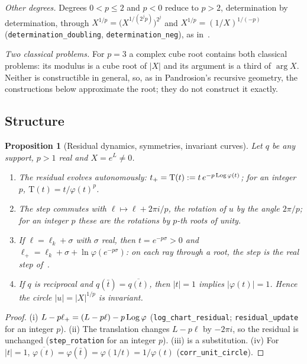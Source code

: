 \documentclass[10pt,a4paper]{article}
\theoremstyle{plain}
\newtheorem{proposition}[theorem]{Proposition}
\theoremstyle{remark}
\numberwithin{equation}{section}
\newcommand{\Tm}{\mathrm{T}}
\newcommand{\lean}[1]{\texttt{#1}}
\begin{document}
\emph{Other degrees.} Degrees $0<p\le2$ and $p<0$ reduce to $p>2$, determination by determination,
through $X^{1/p}=\bigl(X^{1/(2^{j}p)}\bigr)^{2^{j}}$ and $X^{1/p}=(1/X)^{1/(-p)}$
(\lean{determination\_doubling}, \lean{determination\_neg}), as in~\cite{v28}.

\emph{Two classical problems.} For $p=3$ a complex cube root contains both classical problems: its modulus is a cube root of
$|X|$ and its argument is a third of $\arg X$. Neither is constructible in general, so, as in
Pandrosion's recursive geometry, the constructions below approximate the root; they do not
construct it exactly.

\subsection{Structure}

\begin{proposition}[Residual dynamics, symmetries, invariant curves]\label{prop:structure}
Let $q$ be any support, $p>1$ real and $X=e^{L}\neq0$.
\begin{enumerate}
\item[(i)] The residual evolves autonomously: $t_+=\Tm(t):=t\,e^{-p\Log\varphi(t)}$; for an integer
  $p$, $\Tm(t)=t/\varphi(t)^{p}$.
\item[(ii)] The step commutes with $\ell\mapsto\ell+2\pi i/p$, the rotation of $u$ by the angle
  $2\pi/p$; for an integer $p$ these are the rotations by $p$-th roots of unity.
\item[(iii)] If $\ell=\ell_k+\sigma$ with $\sigma$ real, then $t=e^{-p\sigma}>0$ and
  $\ell_+=\ell_k+\sigma+\ln\varphi(e^{-p\sigma})$: on each ray through a root, the step is the real
  step of~\cite{v28}.
\item[(iv)] If $q$ is reciprocal and $q(\bar t)=\overline{q(t)}$, then $|t|=1$ implies
  $|\varphi(t)|=1$. Hence the circle $|u|=|X|^{1/p}$ is invariant.
\end{enumerate}
\end{proposition}

\begin{proof}
(i) $L-p\ell_+=(L-p\ell)-p\operatorname{Log}\varphi$ (\lean{log\_chart\_residual}; \lean{residual\_update} for
an integer $p$). (ii) The translation changes $L-p\ell$ by $-2\pi i$, so the residual is unchanged
(\lean{step\_rotation} for an integer $p$). (iii) is a substitution. (iv) For $|t|=1$,
$\overline{\varphi(t)}=\varphi(\bar t)=\varphi(1/t)=1/\varphi(t)$ (\lean{corr\_unit\_circle}).
\end{proof}
\end{document}
